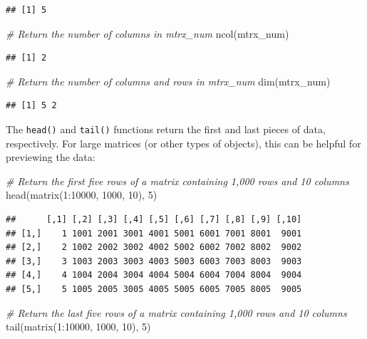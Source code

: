 \documentclass[
]{book}
\newenvironment{Shaded}{\begin{snugshade}}{\end{snugshade}}
\newcommand{\CommentTok}[1]{\textcolor[rgb]{0.56,0.35,0.01}{\textit{#1}}}
\newcommand{\DecValTok}[1]{\textcolor[rgb]{0.00,0.00,0.81}{#1}}
\newcommand{\FunctionTok}[1]{\textcolor[rgb]{0.00,0.00,0.00}{#1}}
\newcommand{\NormalTok}[1]{#1}
\newcommand{\SpecialCharTok}[1]{\textcolor[rgb]{0.00,0.00,0.00}{#1}}
\begin{document}
\begin{verbatim}
## [1] 5
\end{verbatim}

\begin{Shaded}
\begin{Highlighting}[]
\CommentTok{\# Return the number of columns in mtrx\_num}
\FunctionTok{ncol}\NormalTok{(mtrx\_num)}
\end{Highlighting}
\end{Shaded}

\begin{verbatim}
## [1] 2
\end{verbatim}

\begin{Shaded}
\begin{Highlighting}[]
\CommentTok{\# Return the number of columns and rows in mtrx\_num}
\FunctionTok{dim}\NormalTok{(mtrx\_num)}
\end{Highlighting}
\end{Shaded}

\begin{verbatim}
## [1] 5 2
\end{verbatim}

The \texttt{head()} and \texttt{tail()} functions return the first and last pieces of data, respectively. For large matrices (or other types of objects), this can be helpful for previewing the data:

\begin{Shaded}
\begin{Highlighting}[]
\CommentTok{\# Return the first five rows of a matrix containing 1,000 rows and 10 columns}
\FunctionTok{head}\NormalTok{(}\FunctionTok{matrix}\NormalTok{(}\DecValTok{1}\SpecialCharTok{:}\DecValTok{10000}\NormalTok{, }\DecValTok{1000}\NormalTok{, }\DecValTok{10}\NormalTok{), }\DecValTok{5}\NormalTok{)}
\end{Highlighting}
\end{Shaded}

\begin{verbatim}
##      [,1] [,2] [,3] [,4] [,5] [,6] [,7] [,8] [,9] [,10]
## [1,]    1 1001 2001 3001 4001 5001 6001 7001 8001  9001
## [2,]    2 1002 2002 3002 4002 5002 6002 7002 8002  9002
## [3,]    3 1003 2003 3003 4003 5003 6003 7003 8003  9003
## [4,]    4 1004 2004 3004 4004 5004 6004 7004 8004  9004
## [5,]    5 1005 2005 3005 4005 5005 6005 7005 8005  9005
\end{verbatim}

\begin{Shaded}
\begin{Highlighting}[]
\CommentTok{\# Return the last five rows of a matrix containing 1,000 rows and 10 columns}
\FunctionTok{tail}\NormalTok{(}\FunctionTok{matrix}\NormalTok{(}\DecValTok{1}\SpecialCharTok{:}\DecValTok{10000}\NormalTok{, }\DecValTok{1000}\NormalTok{, }\DecValTok{10}\NormalTok{), }\DecValTok{5}\NormalTok{)}
\end{Highlighting}
\end{Shaded}
\end{document}

